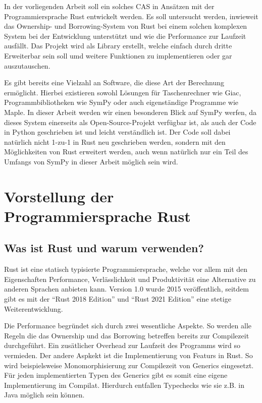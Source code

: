 \documentclass[11pt,a4paper, ngerman]{article}
\begin{document}
In der vorliegenden Arbeit soll ein solches CAS in Ansätzen mit der Programmiersprache Rust entwickelt werden. Es soll untersucht werden, inwieweit das Ownership- und Borrowing-System von Rust bei einem solchen komplexen System bei der Entwicklung unterstützt und wie die Performance zur Laufzeit ausfällt. Das Projekt wird als Library erstellt, welche einfach durch dritte Erweiterbar sein soll umd weitere Funktionen zu implementieren oder gar auszutauschen.

Es gibt bereits eine Vielzahl an Software, die diese Art der Berechnung ermöglicht. Hierbei existieren sowohl Lösungen für Taschenrechner wie Giac, Programmbibliotheken wie SymPy oder auch eigenständige Programme wie Maple. In dieser Arbeit werden wir einen besonderen Blick auf SymPy werfen, da dieses System einerseits als Open-Source-Projekt verfügbar ist, als auch der Code in Python geschrieben ist und leicht verständlich ist. Der Code soll dabei natürlich nicht 1-zu-1 in Rust neu geschrieben werden, sondern mit den Möglichkeiten von Rust erweitert werden, auch wenn natürlich nur ein Teil des Umfangs von SymPy in dieser Arbeit möglich sein wird.

\newpage

\section{Vorstellung der Programmiersprache Rust}
\subsection{Was ist Rust und warum verwenden?}
Rust ist eine statisch typisierte Programmiersprache, welche vor allem mit den Eigenschaften Performance, Verlässlichkeit und Produktivität eine Alternative zu anderen Sprachen anbieten kann. Version 1.0 wurde 2015 veröffentlich, seitdem gibt es mit der ``Rust 2018 Edition'' und ``Rust 2021 Edition'' eine stetige Weiterentwicklung.

Die Performance begründet sich durch zwei wesentliche Aspekte. So werden alle Regeln die das Ownership und das Borrowing betreffen bereits zur Compilezeit durchgeführt. Ein zusätlicher Overhead zur Laufzeit des Programms wird so vermieden. Der andere Aspkekt ist die Implementierung von Featurs in Rust. So wird beispielsweise Monomorphisierung zur Compilezeit von Generics eingesetzt. Für jeden implementierten Typen des Generics gibt es somit eine eigene Implementierung im Compilat. Hierdurch entfallen Typechecks wie sie z.B. in Java möglich sein können.
\end{document}
